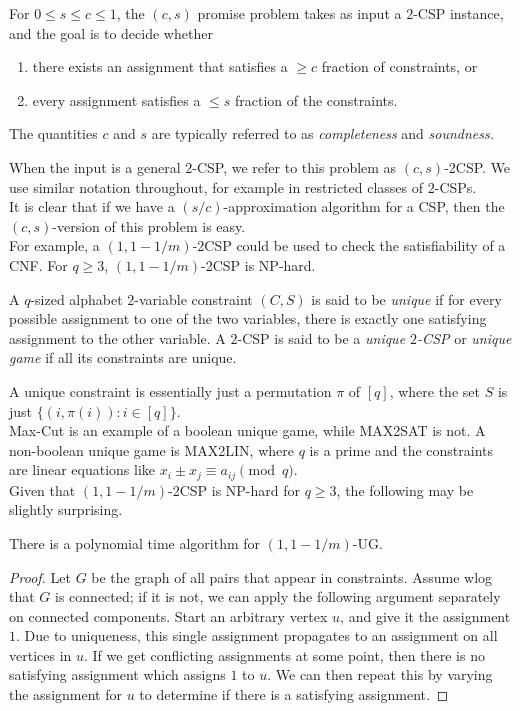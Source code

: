 		\begin{fdef}
			For $0 \le s \le c \le 1$, the $(c,s)$ promise problem takes as input a $2$-CSP instance, and the goal is to decide whether
			\begin{enumerate}
				\item there exists an assignment that satisfies a $\ge c$ fraction of constraints, or
				\item every assignment satisfies a $\le s$ fraction of the constraints.
			\end{enumerate}
			The quantities $c$ and $s$ are typically referred to as \emph{completeness} and \emph{soundness.}
		\end{fdef}
		When the input is a general $2$-CSP, we refer to this problem as $(c,s)$-2CSP. We use similar notation throughout, for example in restricted classes of $2$-CSPs.\\
		It is clear that if we have a $(s/c)$-approximation algorithm for a CSP, then the $(c,s)$-version of this problem is easy.\\

		For example, a $(1,1-1/m)$-2CSP could be used to check the satisfiability of a CNF. For $q \ge 3$, $(1,1-1/m)$-2CSP is \textsf{NP}-hard.

		\begin{fdef}
			A $q$-sized alphabet $2$-variable constraint $(C,S)$ is said to be \emph{unique} if for every possible assignment to one of the two variables, there is exactly one satisfying assignment to the other variable. A $2$-CSP is said to be a \emph{unique $2$-CSP} or \emph{unique game} if all its constraints are unique. 
		\end{fdef}
		A unique constraint is essentially just a permutation $\pi$ of $[q]$, where the set $S$ is just $\{(i,\pi(i)) : i \in [q]\}$.\\
		Max-Cut is an example of a boolean unique game, while MAX2SAT is not. A non-boolean unique game is MAX2LIN, where $q$ is a prime and the constraints are linear equations like $x_i \pm x_j \equiv a_{ij} \pmod{q}$.\\

		Given that $(1,1-1/m)$-2CSP is NP-hard for $q \ge 3$, the following may be slightly surprising.
		\begin{ftheo}[Propagation]
			There is a polynomial time algorithm for $(1,1-1/m)$-UG.
		\end{ftheo}
		\begin{proof}
			Let $G$ be the graph of all pairs that appear in constraints. Assume wlog that $G$ is connected; if it is not, we can apply the following argument separately on connected components. Start an arbitrary vertex $u$, and give it the assignment $1$. Due to uniqueness, this single assignment propagates to an assignment on all vertices in $u$. If we get conflicting assignments at some point, then there is no satisfying assignment which assigns $1$ to $u$. We can then repeat this by varying the assignment for $u$ to determine if there is a satisfying assignment. 
		\end{proof}

